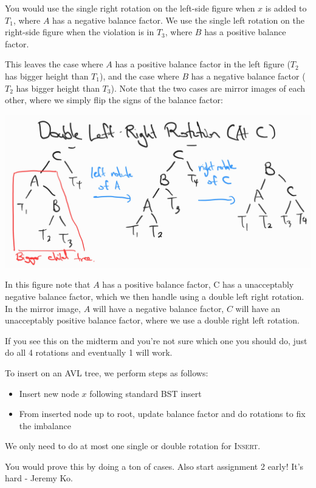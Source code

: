 You would use the single right rotation on the left-side figure when $x$  is added to $T_1$, where $A$ has a negative balance factor. We use the single left rotation on the right-side figure when the violation is in $T_3$, where $B$ has a positive balance factor.

This leaves the case where $A$ has a positive balance factor in the left figure ($T_2$ has bigger height than $T_1$), and the case where $B$ has a negative balance factor ($T_2$ has bigger height than $T_3$). Note that the two cases are mirror images of each other, where we simply flip the signs of the balance factor:

\includegraphics{csc265/figures/avldoubleleftrightrotation.jpg}

In this figure note that $A$ has a positive balance factor, C has a unacceptably negative balance factor, which we then handle using a double left right rotation. In the mirror image, $A$ will have a negative balance factor, $C$ will have an unacceptably positive balance factor, where we use a double right left rotation. 

\begin{remark}
If you see this on the midterm and you're not sure which one you should do, just do all 4 rotations and eventually 1 will work.
\end{remark}

\noindent To insert on an AVL tree, we perform steps as follows:
\begin{itemize}
\item Insert new node $x$ following standard BST insert
\item From inserted node up to root, update balance factor and do rotations to fix the imbalance
\end{itemize}

\begin{claim}
We only need to do at most one  single or double rotation for \textsc{Insert}.
\end{claim}
You would prove this by doing a ton of cases. Also start assignment 2 early! It's hard - Jeremy Ko.
